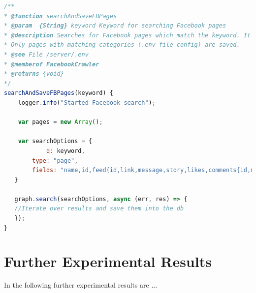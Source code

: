 \documentclass[11pt,titlepage,oneside,openany]{book}
\begin{document}
\begin{lstlisting}[caption={FacebookCrawler.searchAndSaveFBPages},captionpos=b,language=JavaScript,label={lst:facebookCrawler}]
 /**
* @function searchAndSaveFBPages
* @param  {String} keyword Keyword for searching Facebook pages
* @description Searches for Facebook pages which match the keyword. It also inserts the found pages and their posts and comments into the database. 
* Only pages with matching categories (.env file config) are saved.
* @see File /server/.env
* @memberof FacebookCrawler
* @returns {void} 
*/
searchAndSaveFBPages(keyword) {
	logger.info("Started Facebook search");

    var pages = new Array();

   	var searchOptions = {
    		q: keyword,
        type: "page",
        fields: "name,id,feed{id,link,message,story,likes,comments{id,message},created_time},category"
   }

   graph.search(searchOptions, async (err, res) => {
   //Iterate over results and save them into the db
   });
}
\end{lstlisting}







\chapter{Further Experimental Results}
\label{cha:appendix-b}

In the following further experimental results are ...


\newpage


\pagestyle{empty}
\end{document}
